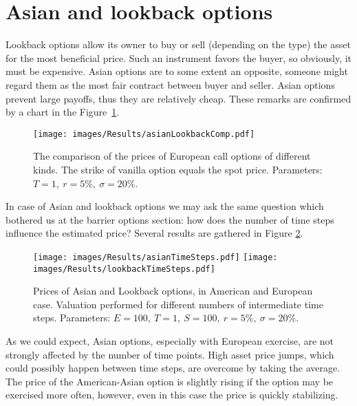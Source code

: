\documentclass[a4paper,11pt, twoside]{book}
\theoremstyle{definition}
\theoremstyle{remark}
\begin{document}
\section{Asian and lookback options}
Lookback options allow its owner to buy or sell (depending on the type) the asset for the most beneficial price. Such an instrument favors the buyer, so obviously, it must be expensive. Asian options are to some extent an opposite, someone might regard them as the most fair contract between buyer and seller. Asian options prevent large payoffs, thus they are relatively cheap. These remarks are confirmed by a chart in the Figure~\ref{fig:results:asianLookbackComp}.

\begin{figure}[!htb]
\centering
 \texttt{[image: images/Results/asianLookbackComp.pdf]}
\caption{The comparison of the prices of European call options of different kinds. The strike of vanilla option equals the spot price. Parameters: $T=1,\ r=5\%,\ \sigma=20\%$.}
\label{fig:results:asianLookbackComp}
\end{figure}

In case of Asian and lookback options we may ask the same question which bothered us at the barrier options section: how does the number of time steps influence the estimated price? Several results are gathered in Figure \ref{fig:results:asianTimeSteps}.

\begin{figure}[!htb]
\centering
 \texttt{[image: images/Results/asianTimeSteps.pdf]}
 \texttt{[image: images/Results/lookbackTimeSteps.pdf]}
\caption{Prices of Asian and Lookback options, in American and European case. Valuation performed for different numbers of intermediate time steps. Parameters: $E=100,\ T=1,\ S=100,\ r=5\%,\ \sigma=20\%$.}
\label{fig:results:asianTimeSteps}
\end{figure}

As we could expect, Asian options, especially with European exercise, are not strongly affected by the number of time points. High asset price jumps, which could possibly happen between time steps, are overcome by taking the average. The price of the American-Asian option is slightly rising if the option may be exercised more often, however, even in this case the price is quickly stabilizing.
\end{document}
